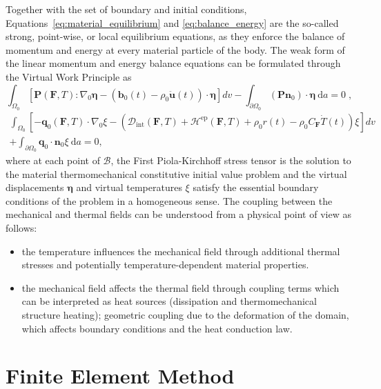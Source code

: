 Together with the set of boundary and initial conditions, Equations~\eqref{eq:material_equilibrium} and \eqref{eq:balance_energy} are the so-called strong, point-wise, or local equilibrium equations, as they enforce the balance of momentum and energy at every material particle of the body.
The weak form of the linear momentum and energy balance equations can be formulated through the Virtual Work Principle as
\begin{equation} \label{eq:weak_momentum_balance}
  \int_{\Omega_0} [\bm{P}(\bm{F},T):\nabla_0 \bm{\eta} - (\bm{b}_0(t)-\rho_0\ddot{\bm{u}}(t))\cdot \bm{\eta}]d v - \int_{\partial\Omega_0} (\bm{P}\bm{n}_{0})\cdot \bm{\eta} \ \mathrm{d} a = 0\;,
\end{equation}
\begin{multline} \label{eq:weak_energy_balance}
  \int_{\Omega_0}   \left[-\bm{q}_{0}(\bm{F},T)\cdot \nabla_0 \xi - \left(\mathcal D_\text{int}(\bm{F},T)+\mathcal H^\text{ep}(\bm{F},T)+ \rho_0 r(t)-\rho_0 C_{\bm F}\dot T(t)\right) \xi\right]d v\\ + \int_{\partial\Omega_0} \bm{q}_{0}\cdot \bm{n}_{0} \xi \ \mathrm{d} a = 0,
\end{multline}
where at each point of $\mathscr{B}$, the First Piola-Kirchhoff stress tensor is the solution to the material thermomechanical constitutive initial value problem and the virtual displacements \(\bm{\eta}\) and virtual temperatures \(\xi\) satisfy the essential boundary conditions of the problem in a homogeneous sense.
The coupling between the mechanical and thermal fields can be understood from a physical point of view as follows:
\begin{itemize}
\item the temperature influences the mechanical field through additional thermal stresses and potentially temperature-dependent material properties.
\item  the mechanical field affects the thermal field through coupling terms which can be interpreted as heat sources (dissipation and thermomechanical structure heating); geometric coupling due to the deformation of the domain, which affects boundary conditions and the heat conduction law.
\end{itemize}

\section{Finite Element Method} \label{sec:fem_mech}


